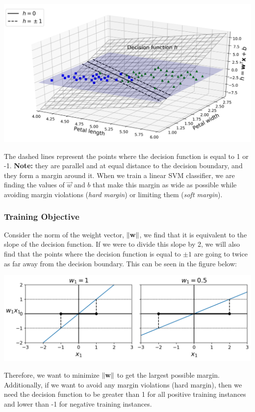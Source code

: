 \includegraphics[scale=0.65]{Images/svm_DecisionFunc.PNG}

\noindent
The dashed lines represent the points where the decision function is equal to 1 or -1. \textbf{Note:}
they are parallel and at equal distance to the decision boundary, and they form a margin around
it. When we train a linear SVM classifier, we are finding the values of $\vec{w}$ and $b$ that 
make this margin as wide as possible while avoiding margin violations (\textit{hard margin}) 
or limiting them (\textit{soft margin}). 

\subsubsection*{Training Objective}

Consider the norm of the weight vector, $\lVert\mathbf{w}\rVert$, we find that it is equivalent to the slope of the
decision function. If we were to divide this slope by 2, we will also find that the points where the decision
function is equal to $\pm 1$ are going to twice as far away from the decision boundary. This can be seen in the 
figure below:

\includegraphics[scale=0.65]{Images/weightVec.PNG}

\noindent
Therefore, we want to minimize $\lVert\mathbf{w}\rVert$ to get the largest possible margin. Additionally, if we want to
avoid any margin violations (hard margin), then we need the decision function to be greater than 1 for all 
positive training instances and lower than -1 for negative training instances. \\

